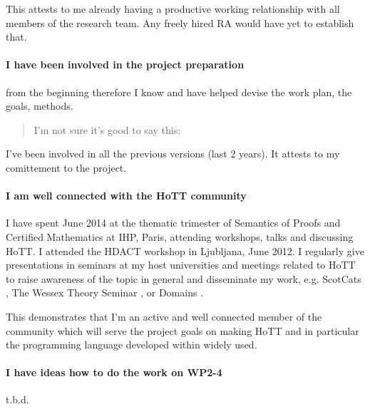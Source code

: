 \documentclass[a4paper]{article}
\begin{document}
This attests to me already having a productive working relationship with all members of the research team. Any freely hired RA would have yet to establish that. 

\paragraph{I have been involved in the project preparation} from the beginning therefore I know and have helped devise the work plan, the goals, methods. 
\begin{quote}{\small{I'm not sure it's good to say this:}}
  \end{quote}
%  
I've been involved in all the previous versions (last 2 years). It attests to my comittement to the project. 




\paragraph{I am well connected with the HoTT community}
I have spent June 2014 at the thematic trimester of Semantics of Proofs and Certified Mathematics at IHP, Paris, attending workshops, talks and discussing HoTT.
%
I attended the HDACT workshop in Ljubljana, June 2012. 
%
I regularly give presentations in seminars at my host universities and
meetings related to HoTT to raise awareness of the topic in general
and disseminate my work, e.g. ScotCats , The
Wessex Theory Seminar , or Domains .

This demonstrates that I'm an active and well connected member of
the community which will serve the project goals on making HoTT and in
particular the programming language developed within widely used.

\paragraph{I have ideas how to do the work on WP2-4}
t.b.d.


\end{document}
